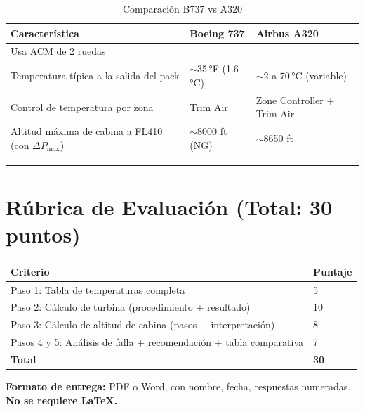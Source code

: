 \documentclass[11pt, a4paper]{article}
\begin{document}
\begin{table}[h]
\centering
\caption{Comparación B737 vs A320}
\begin{tabularx}{\textwidth}{l X X}
\toprule
\textbf{Característica} & \textbf{Boeing 737} & \textbf{Airbus A320} \\ \midrule
Usa ACM de 2 ruedas & & \\ \midrule
Temperatura típica a la salida del pack & $\sim$35\,°F (1.6\,°C) & $\sim$2 a 70\,°C (variable) \\ \midrule
Control de temperatura por zona & Trim Air & Zone Controller + Trim Air \\ \midrule
Altitud máxima de cabina a FL410 (con $\Delta P_{\max}$) & $\sim$8000 ft (NG) & $\sim$8650 ft \\ \bottomrule
\end{tabularx}
\end{table}

\vspace{0.5cm}
\noindent\rule{\textwidth}{0.4pt}

\section*{Rúbrica de Evaluación (Total: 30 puntos)}
\begin{table}[h]
\centering
\begin{tabularx}{\textwidth}{l X}
\toprule
\textbf{Criterio} & \textbf{Puntaje} \\ \midrule
Paso 1: Tabla de temperaturas completa & 5 \\ \midrule
Paso 2: Cálculo de turbina (procedimiento + resultado) & 10 \\ \midrule
Paso 3: Cálculo de altitud de cabina (pasos + interpretación) & 8 \\ \midrule
Pasos 4 y 5: Análisis de falla + recomendación + tabla comparativa & 7 \\ \bottomrule
\textbf{Total} & \textbf{30} \\ \bottomrule
\end{tabularx}
\end{table}

\vspace{0.3cm}
\noindent\textbf{Formato de entrega:} PDF o Word, con nombre, fecha, respuestas numeradas. \\
\noindent\textbf{No se requiere LaTeX.}
\end{document}
